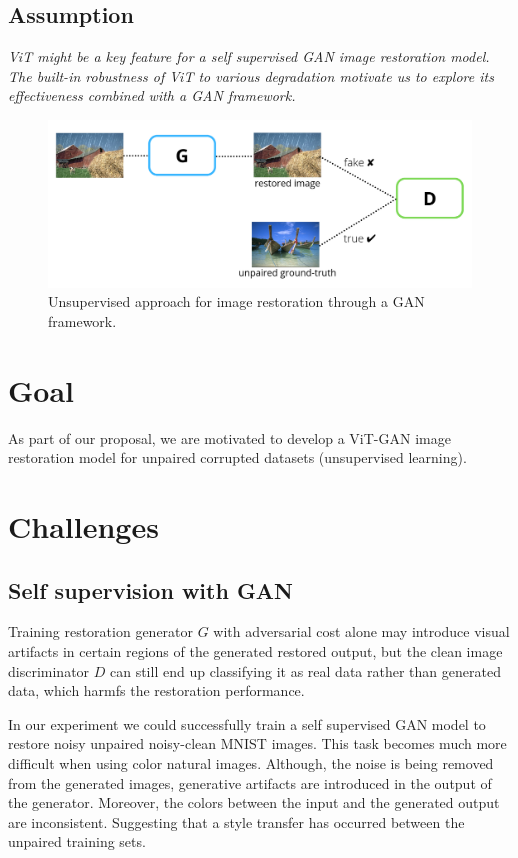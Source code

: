 \subsection*{Assumption}
\par \emph{ViT might be a key feature for a self supervised GAN image restoration model. The built-in robustness of ViT to various degradation motivate us to explore its effectiveness combined with a GAN framework.}
\begin{figure}[h]
    \centering
    \includegraphics[scale=0.25]{./figures/unsup_GAN.png}
    \caption{Unsupervised approach for image restoration through a GAN framework.}
    \label{fig: unsup_GAN}
\end{figure}
\newpage
\section{Goal}
As part of our proposal, we are motivated to develop a ViT-GAN image restoration model for unpaired corrupted datasets (unsupervised learning).
\section{Challenges}
\subsection*{Self supervision with GAN}
\par Training restoration generator $G$ with adversarial cost alone may introduce visual artifacts in certain regions of the generated restored output, but the clean image discriminator $D$ can still end up classifying it as real data rather than generated data, which harmfs the restoration performance.
\par In our experiment we could successfully train a self supervised GAN model to restore noisy unpaired noisy-clean MNIST images. This task becomes much more difficult when using color natural images. Although, the noise is being removed from the generated images, generative artifacts are introduced in the output of the generator. Moreover, the colors between the input and the generated output are inconsistent. Suggesting that a style transfer has occurred between the unpaired training sets.
